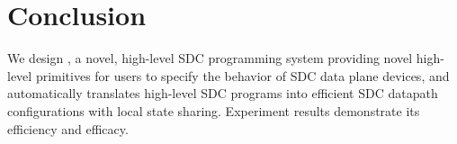 \vspace{-2mm}
\section{Conclusion}\label{sec:conclusion}
\vspace{-1mm}
We design \concept{}, a novel, high-level SDC programming system providing novel high-level primitives for users to specify the behavior
	of SDC data plane devices, and automatically translates
high-level SDC programs into efficient SDC datapath configurations with local
state sharing. Experiment results demonstrate its efficiency and efficacy.
\vspace{-4mm}





